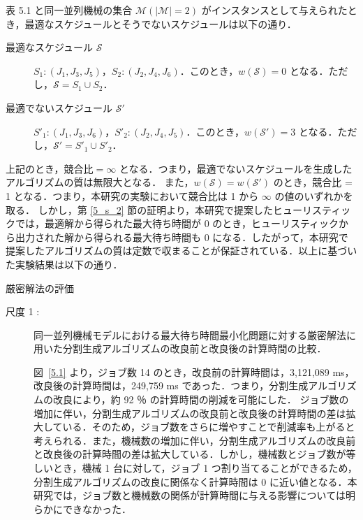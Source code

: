 \documentclass[12pt]{optlab-bachelor}
\begin{document}
表 5.1 と同一並列機械の集合 $\mathcal{M} (|\mathcal{M}| = 2)$ がインスタンスとして与えられたとき，最適なスケジュールとそうでないスケジュールは以下の通り．
\begin{description}
  \item[最適なスケジュール $\mathcal{S}$] $S_1 : (J_1, J_3, J_5)$，$S_2 : (J_2, J_4, J_6)$．このとき，$w(\mathcal{S}) = 0$ となる．ただし，$\mathcal{S} = S_1 \cup S_2$．
  \item[最適でないスケジュール $\mathcal{S}'$] $S'_1 : (J_1, J_3, J_6)$，$S'_2 : (J_2, J_4, J_5)$．このとき，$w(\mathcal{S}') = 3$ となる．ただし，$\mathcal{S}' = S'_1 \cup S'_2$．
\end{description}

上記のとき，$\text{競合比} = \infty$ となる．つまり，最適でないスケジュールを生成したアルゴリズムの質は無限大となる．
また，$w(\mathcal{S}) = w(\mathcal{S}')$ のとき，競合比 = 1 となる．つまり，本研究の実験において競合比は 1 から $\infty$ の値のいずれかを取る．
しかし，第 \ref{5_s_2} 節の証明より，本研究で提案したヒューリスティックでは，最適解から得られた最大待ち時間が 0 のとき，ヒューリスティックから出力された解から得られる最大待ち時間も 0 になる．したがって，本研究で提案したアルゴリズムの質は定数で収まることが保証されている．以上に基づいた実験結果は以下の通り．
\begin{description}
  \item[厳密解法の評価]
\end{description}
\begin{description}
  \item[尺度 1 :] 同一並列機械モデルにおける最大待ち時間最小化問題に対する厳密解法に用いた分割生成アルゴリズムの改良前と改良後の計算時間の比較．

  図~\ref{5.1} より，ジョブ数 14 のとき，改良前の計算時間は，3,121,089 ms，改良後の計算時間は，249,759 ms であった．つまり，分割生成アルゴリズムの改良により，約 92 ％ の計算時間の削減を可能にした．
  ジョブ数の増加に伴い，分割生成アルゴリズムの改良前と改良後の計算時間の差は拡大している．そのため，ジョブ数をさらに増やすことで削減率も上がると考えられる．また，機械数の増加に伴い，分割生成アルゴリズムの改良前と改良後の計算時間の差は拡大している．しかし，機械数とジョブ数が等しいとき，機械 1 台に対して，ジョブ 1 つ割り当てることができるため，分割生成アルゴリズムの改良に関係なく計算時間は 0 に近い値となる．本研究では，ジョブ数と機械数の関係が計算時間に与える影響については明らかにできなかった．
\end{description}
\end{document}
